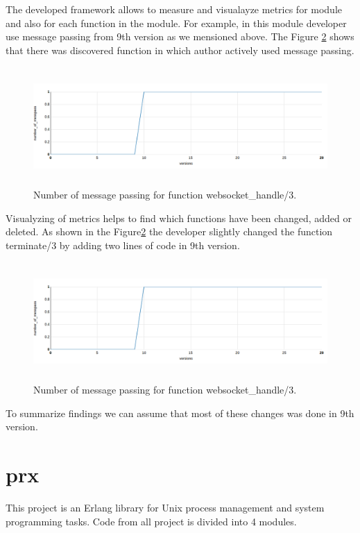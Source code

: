 The developed framework allows to measure and visualayze metrics for module and also for each function in the module. For example, in this module developer use message passing from 9th version as we mensioned above. The Figure \ref{fig:chat3} shows that there was discovered function in which author actively used message passing.

\begin{figure}[h]
	\centering
	\includegraphics[height=45mm]{figures/chat3.png}
	\caption{
	Number of message passing for function websocket\_handle/3.}
	\label{fig:chat3}
\end{figure}

Visualyzing of metrics helps to find which functions have been changed, added or deleted. As shown in the Figure\ref{fig:chat3} the developer slightly changed the function terminate/3 by adding two lines of code in 9th version.
\begin{figure}[h]
	\centering
	\includegraphics[height=45mm]{figures/chat3.png}
	\caption{
		Number of message passing for function websocket\_handle/3.}
	\label{fig:chat3}
\end{figure}
 
To summarize findings we can assume that most of these changes was done in 9th version.

\section{prx}

This project is an Erlang library for Unix process management and system programming tasks. Code from all project is divided into 4 modules. 


